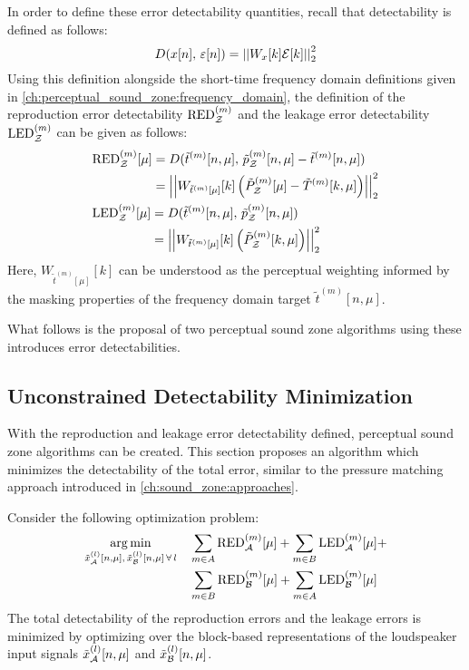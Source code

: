 In order to define these error detectability quantities, recall that detectability is defined as follows: 
\begin{equation}
    D(x[n],\,\varepsilon[n]) = \norm[2][2]{W_x[k]\mathcal{E}[k]} 
\end{equation}
Using this definition alongside the short-time frequency domain definitions given in \autoref{ch:perceptual_sound_zone:frequency_domain}, 
the definition of the reproduction error detectability $\text{RED}^{(m)}_{\mathcal{Z}}$ 
and the leakage error detectability $\text{LED}^{(m)}_{\mathcal{Z}}$ can be given as follows:
\begin{align}
    &\begin{aligned}
        \text{RED}^{(m)}_\zz[\mu] &= D(\tilde{t}^{(m)}[n, \mu],\,\tilde{p}_\zz^{(m)}[n, \mu] - \tilde{t}^{(m)}[n, \mu]) \\
                       &= \norm[2][2]{W_{\tilde{t}^{(m)}[\mu]}[k]
                            \left(\tilde{P}_\zz^{(m)}[\mu] - \tilde{T}^{(m)}[k, \mu]\right)}
    \end{aligned}\\
    &\begin{aligned}
        \text{LED}^{(m)}_\zz[\mu] &= D(\tilde{t}^{(m)}[n, \mu],\,\tilde{p}_\zz^{(m)}[n, \mu]) \\
                       &= \norm[2][2]{W_{\tilde{t}^{(m)}[\mu]}[k]
                            \left(\tilde{P}_\zz^{(m)}[k, \mu]\right)}
    \end{aligned}
\end{align}
Here, $W_{\tilde{t}^{(m)}[\mu]}[k]$ can be understood as the perceptual weighting informed by the masking properties of the
frequency domain target $\tilde{t}^{(m)}[n, \mu]$.

What follows is the proposal of two perceptual sound zone algorithms using these introduces error detectabilities.

\subsection{Unconstrained Detectability Minimization}
With the reproduction and leakage error detectability defined, perceptual sound zone algorithms can be created.
This section proposes an algorithm which minimizes the detectability of the total error, similar to the 
pressure matching approach introduced in \autoref{ch:sound_zone:approaches}.

Consider the following optimization problem:
\begin{equation}
    \begin{aligned}
    \argmin{\tilde{x}_\za^{(l)}[n,\mu],\,\tilde{x}_\zb^{(l)}[n,\mu]\,\forall\,l}{
       & \sum_{m\in A}\text{RED}_\za^{(m)}[\mu] + \sum_{m\in B}\text{LED}_\za^{(m)}[\mu] +\\
       & \sum_{m\in B}\text{RED}_\zb^{(m)}[\mu] + \sum_{m\in A}\text{LED}_\zb^{(m)}[\mu]
    }
    \end{aligned}
\end{equation}
The total detectability of the reproduction errors and the leakage errors is minimized by optimizing over the 
block-based representations of the loudspeaker input signals $\tilde{x}_{\mathcal{A}}^{(l)}[n,\mu]$ and $\tilde{x}_{\mathcal{B}}^{(l)}[n,\mu]$.


